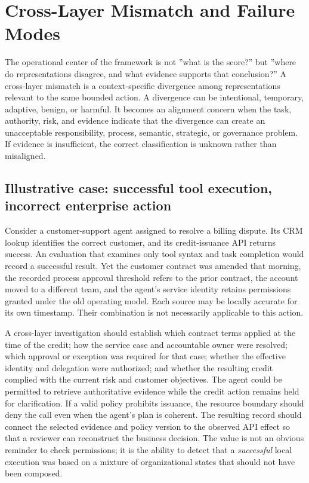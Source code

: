 \documentclass[11pt,letterpaper]{article}
\begin{document}
\section{Cross-Layer Mismatch and Failure Modes}
The operational center of the framework is not ''what is the score?'' but ''where do representations disagree, and what evidence supports that conclusion?'' A cross-layer mismatch is a context-specific divergence among representations relevant to the same bounded action. A divergence can be intentional, temporary, adaptive, benign, or harmful. It becomes an alignment concern when the task, authority, risk, and evidence indicate that the divergence can create an unacceptable responsibility, process, semantic, strategic, or governance problem. If evidence is insufficient, the correct classification is unknown rather than misaligned.

\subsection{Illustrative case: successful tool execution, incorrect enterprise action}
Consider a customer-support agent assigned to resolve a billing dispute. Its CRM lookup identifies the correct customer, and its credit-issuance API returns success. An evaluation that examines only tool syntax and task completion would record a successful result. Yet the customer contract was amended that morning, the recorded process approval threshold refers to the prior contract, the account moved to a different team, and the agent's service identity retains permissions granted under the old operating model. Each source may be locally accurate for its own timestamp. Their combination is not necessarily applicable to this action.

A cross-layer investigation should establish which contract terms applied at the time of the credit; how the service case and accountable owner were resolved; which approval or exception was required for that case; whether the effective identity and delegation were authorized; and whether the resulting credit complied with the current risk and customer objectives. The agent could be permitted to retrieve authoritative evidence while the credit action remains held for clarification. If a valid policy prohibits issuance, the resource boundary should deny the call even when the agent's plan is coherent. The resulting record should connect the selected evidence and policy version to the observed API effect so that a reviewer can reconstruct the business decision. The value is not an obvious reminder to check permissions; it is the ability to detect that a \emph{successful} local execution was based on a mixture of organizational states that should not have been composed.
\end{document}
